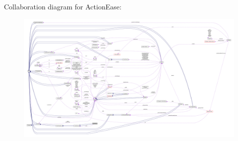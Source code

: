Collaboration diagram for Action\+Ease\+:
\nopagebreak
\begin{figure}[H]
\begin{center}
\leavevmode
\includegraphics[width=350pt]{classActionEase__coll__graph}
\end{center}
\end{figure}
